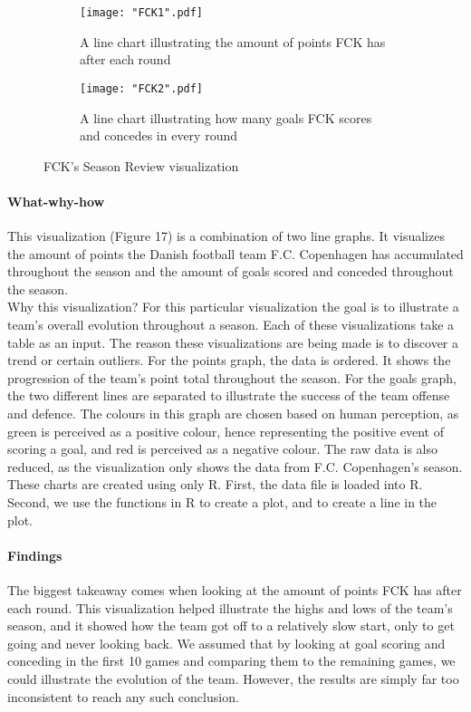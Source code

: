\documentclass[Report.tex]{subfiles}
\begin{document}
\begin{figure}
\center
\begin{subfigure}[b]{0.8\textwidth}
\texttt{[image: "FCK1".pdf]}
\caption{A line chart illustrating the amount of points FCK has after each round}
\end{subfigure}

\begin{subfigure}[b]{0.8\textwidth}
\texttt{[image: "FCK2".pdf]}
\caption{A line chart illustrating how many goals FCK scores and concedes in every round}
\end{subfigure}
\caption{FCK's Season Review visualization}
\end{figure}


\paragraph{What-why-how\\}
This visualization (Figure 17) is a combination of two line graphs. It visualizes the amount of points the Danish football team F.C. Copenhagen has accumulated throughout the season and the amount of goals scored and conceded throughout the season.\\
Why this visualization? For this particular visualization the goal is to illustrate a team’s overall evolution throughout a season. Each of these visualizations take a table as an input. The reason these visualizations are being made is to discover a trend or certain outliers. For the points graph, the data is ordered. It shows the progression of the team’s point total throughout the season. For the goals graph, the two different lines are separated to illustrate the success of the team offense and defence. The colours in this graph are chosen based on human perception, as green is perceived as a positive colour, hence representing the positive event of scoring a goal, and red is perceived as a negative colour. The raw data is also reduced, as the visualization only shows the data from F.C. Copenhagen’s season.\\
These charts are created using only R. First, the data file is loaded into R. Second, we use the functions in R to create a plot, and to create a line in the plot.
\paragraph{Findings\\}
The biggest takeaway comes when looking at the amount of points FCK has after each round. This visualization helped illustrate the highs and lows of the team’s season, and it showed how the team got off to a relatively slow start, only to get going and never looking back. We assumed that by looking at goal scoring and conceding in the first 10 games and comparing them to the remaining games, we could illustrate the evolution of the team. However, the results are simply far too inconsistent to reach any such conclusion. 
\end{document}
